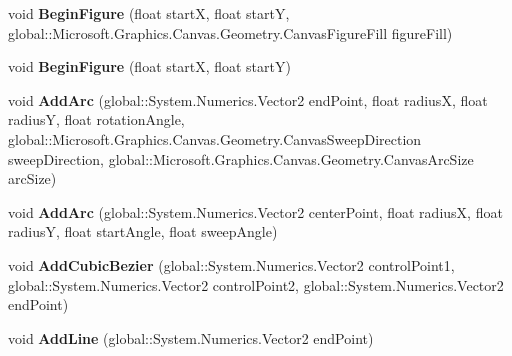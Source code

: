 \begin{DoxyCompactItemize}
void {\bfseries Begin\+Figure} (float startX, float startY, global\+::\+Microsoft.\+Graphics.\+Canvas.\+Geometry.\+Canvas\+Figure\+Fill figure\+Fill)
\item 
\mbox{\label{class_microsoft_1_1_graphics_1_1_canvas_1_1_geometry_1_1_canvas_path_builder_accd5484b3a6afe779cc05b671ceab2d6}} 
void {\bfseries Begin\+Figure} (float startX, float startY)
\item 
\mbox{\label{class_microsoft_1_1_graphics_1_1_canvas_1_1_geometry_1_1_canvas_path_builder_ad5ebacfef42f16ddadc505b289750362}} 
void {\bfseries Add\+Arc} (global\+::\+System.\+Numerics.\+Vector2 end\+Point, float radiusX, float radiusY, float rotation\+Angle, global\+::\+Microsoft.\+Graphics.\+Canvas.\+Geometry.\+Canvas\+Sweep\+Direction sweep\+Direction, global\+::\+Microsoft.\+Graphics.\+Canvas.\+Geometry.\+Canvas\+Arc\+Size arc\+Size)
\item 
\mbox{\label{class_microsoft_1_1_graphics_1_1_canvas_1_1_geometry_1_1_canvas_path_builder_a5bc022c0799cfd3c392f412fc76aeb53}} 
void {\bfseries Add\+Arc} (global\+::\+System.\+Numerics.\+Vector2 center\+Point, float radiusX, float radiusY, float start\+Angle, float sweep\+Angle)
\item 
\mbox{\label{class_microsoft_1_1_graphics_1_1_canvas_1_1_geometry_1_1_canvas_path_builder_a192b933b8c38dcc6fd799668ab3a2e96}} 
void {\bfseries Add\+Cubic\+Bezier} (global\+::\+System.\+Numerics.\+Vector2 control\+Point1, global\+::\+System.\+Numerics.\+Vector2 control\+Point2, global\+::\+System.\+Numerics.\+Vector2 end\+Point)
\item 
\mbox{\label{class_microsoft_1_1_graphics_1_1_canvas_1_1_geometry_1_1_canvas_path_builder_a977ac73b78685510b323dc0f9f9d92a2}} 
void {\bfseries Add\+Line} (global\+::\+System.\+Numerics.\+Vector2 end\+Point)
\item 
\mbox{\label{class_microsoft_1_1_graphics_1_1_canvas_1_1_geometry_1_1_canvas_path_builder_ab36909f8900a9d581be0045841b600a6}} 

\end{DoxyCompactItemize}
